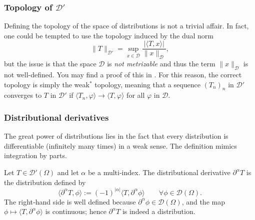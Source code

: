 \subsubsection{\texorpdfstring{Topology of $\mathcal D'$}{Topology of D'}}
Defining the topology of the space of distributions is not a trivial affair. In fact, one could be tempted to use the topology induced by the dual norm 
$$ \| T \|_{\mathcal D'} = \sup_{x \in \mathcal D} \frac{|\langle T, x\rangle |}{\|x\|_{\mathcal{D}}} , $$
but the issue is that the space $\mathcal D$ is \emph{not metrizable} and thus the term $\|x\|_{\mathcal D}$ is not well-defined. You may find a proof of this in \cite{MR1157815}. For this reason, the correct topology is simply the weak$^*$ topology, meaning that a sequence $(T_n)_n$ in $\mathcal D'$ converges to $T$ in $\mathcal D'$ if $\langle T_n, \varphi\rangle \to \langle T, \varphi\rangle$ for all $\varphi$ in $\mathcal D$. 


\subsubsection{Distributional derivatives}
The great power of distributions lies in the fact that every distribution is differentiable (infinitely many times) in a weak sense. The definition mimics integration by parts.

\begin{definition}
Let $T\in\mathcal D'(\Omega)$ and let $\alpha$ be a multi‑index. The distributional derivative $\partial^\alpha T$ is the distribution defined by
\[
\langle\partial^\alpha T,\phi\rangle:=(-1)^{|\alpha|}\langle T,\partial^\alpha\phi\rangle\qquad\forall\phi\in\mathcal D(\Omega).
\]
The right‑hand side is well defined because $\partial^\alpha\phi\in\mathcal D(\Omega)$, and the map $\phi\mapsto\langle T,\partial^\alpha\phi\rangle$ is continuous; hence $\partial^\alpha T$ is indeed a distribution.
\end{definition}


